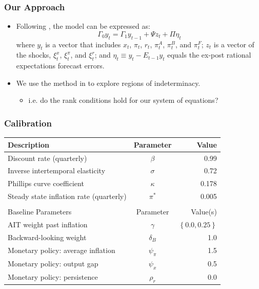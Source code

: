 \documentclass{beamer}
\begin{document}
\begin{frame}
	\frametitle{Our Approach}
	\begin{itemize}
		\setlength{\itemsep}{1em}
		\item Following \citet{sims2002}, the model can be expressed as:
		\begin{equation}
			\Gamma_0 y_t = \Gamma_1 y_{t-1} + \Psi z_t + \Pi \eta_t
		\end{equation}
		where $y_t$ is a vector that includes $x_t$, $\pi_t$, $r_t$, $\pi_t^A$, $\pi_t^B$, and $\pi_t^F$; $z_t$ is a vector of the shocks, $\xi_t^x$, $\xi_t^\pi$, and $\xi_t^r$; and $\eta_t \equiv y_t - E_{t-1} y_t$ equals the ex-post rational expectations forecast errors. 
		\item We use the method in \citet{sims2002} to explore regions of indeterminacy.
		\begin{itemize}
			\item i.e. do the rank conditions hold for our system of equations?
		\end{itemize}
	\end{itemize}
\end{frame}

\begin{frame}
	\frametitle{Calibration}
	\begin{table}[htp]
		\begin{center}
			\vspace*{-1pc}\begin{tabular}{lcr}
				Description & Parameter & Value \\ \hline
				Discount rate (quarterly) & $\beta$ & 0.99 \\
				Inverse intertemporal elasticity & $\sigma$ & 0.72 \\
				Phillips curve coefficient & $\kappa$ & 0.178 \\
				Steady state inflation rate (quarterly) & $\pi^*$ & 0.005 \\ [0.25pc]
				\hline \\ [-0.25pc]
				Baseline Parameters & Parameter & Value(s) \\ \hline
				AIT weight past inflation & $\gamma$ & $\left\{ 0.0, 0.25 \right\}$ \\
				Backward-looking weight & $\delta_B$ & 1.0 \\
				Monetary policy: average inflation & $\psi_\pi$ & 1.5 \\
				Monetary policy: output gap & $\psi_x$ & 0.5 \\
				Monetary policy: persistence & $\rho_r$ & 0.0 \\ \hline
			\end{tabular}
		\end{center}
	\end{table}
\end{frame}
\end{document}
